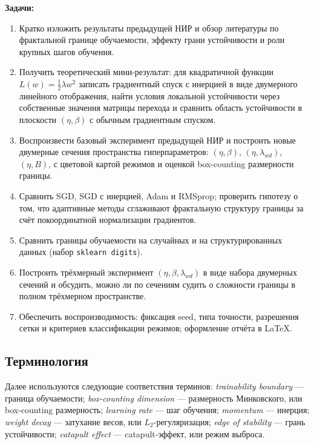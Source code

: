 \textbf{Задачи:}
\begin{enumerate}[leftmargin=*,topsep=2pt,itemsep=2pt]
  \item Кратко изложить результаты предыдущей НИР и обзор литературы по
        фрактальной границе обучаемости, эффекту грани устойчивости и роли
        крупных шагов обучения.
  \item Получить теоретический мини-результат: для квадратичной функции
        $L(w)=\tfrac12\lambda w^2$ записать градиентный спуск с инерцией в виде
        двумерного линейного отображения, найти условия локальной устойчивости
        через собственные значения матрицы перехода и сравнить область
        устойчивости в плоскости $(\eta,\beta)$ с обычным градиентным спуском.
  \item Воспроизвести базовый эксперимент предыдущей НИР и построить новые
        двумерные сечения пространства гиперпараметров: $(\eta,\beta)$,
        $(\eta,\lambda_{wd})$, $(\eta,B)$, с цветовой картой режимов и оценкой
        box-counting размерности границы.
  \item Сравнить SGD, SGD с инерцией, Adam и RMSprop; проверить гипотезу о том,
        что адаптивные методы сглаживают фрактальную структуру границы за счёт
        покоординатной нормализации градиентов.
  \item Сравнить границы обучаемости на случайных и на структурированных данных
        (набор \texttt{sklearn digits}).
  \item Построить трёхмерный эксперимент $(\eta,\beta,\lambda_{wd})$ в виде
        набора двумерных сечений и обсудить, можно ли по сечениям судить о
        сложности границы в полном трёхмерном пространстве.
  \item Обеспечить воспроизводимость: фиксация seed, типа точности, разрешения
        сетки и критериев классификации режимов; оформление отчёта в \LaTeX.
\end{enumerate}

\subsection{Терминология}

Далее используются следующие соответствия терминов:
\emph{trainability boundary} --- граница обучаемости;
\emph{box-counting dimension} --- размерность Минковского, или box-counting
размерность; \emph{learning rate} --- шаг обучения; \emph{momentum} --- инерция;
\emph{weight decay} --- затухание весов, или $L_2$-регуляризация;
\emph{edge of stability} --- грань устойчивости; \emph{catapult effect} ---
catapult-эффект, или режим выброса.

